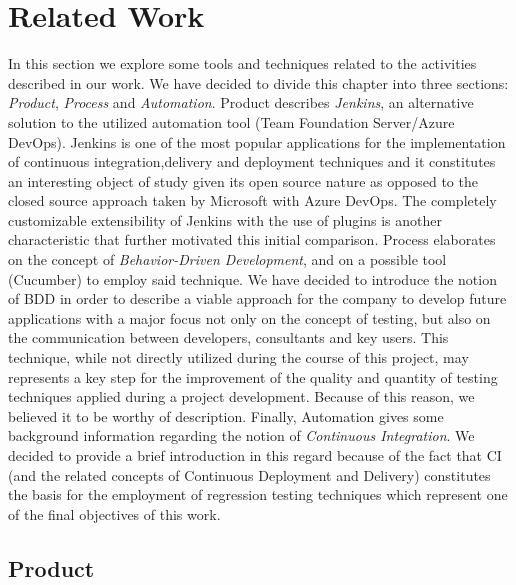 \chapter{Related Work}

In this section we explore some tools and techniques related to the activities described in our work. We have decided to divide this chapter into three sections: \textit{Product}, \textit{Process} and \textit{Automation}. 
Product describes \textit{Jenkins}, an alternative solution to the utilized automation tool (Team Foundation Server/Azure DevOps). Jenkins is one of the most popular applications for the implementation of continuous integration,delivery and deployment techniques and it constitutes an interesting object of study given its open source nature as opposed to the closed source approach taken by Microsoft with Azure DevOps. The completely customizable extensibility of Jenkins with the use of plugins is another characteristic that further motivated this initial comparison. 
Process elaborates on the concept of \textit{Behavior-Driven Development}, and on a possible tool (Cucumber) to employ said technique. We have decided to introduce the notion of BDD in order to describe a viable approach for the company to develop future applications with a major focus not only on the concept of testing, but also on the communication between developers, consultants and key users. This technique, while not directly utilized during the course of this project, may represents a key step for the improvement of the quality and quantity of testing techniques applied during a project development. Because of this reason, we believed it to be worthy of description. 
Finally, Automation gives some background information regarding the notion of \textit{Continuous Integration}. We decided to provide a brief introduction in this regard because of the fact that CI (and the related concepts of Continuous Deployment and Delivery) constitutes the basis for the employment of regression testing techniques which represent one of the final objectives of this work.

\section{Product} 

